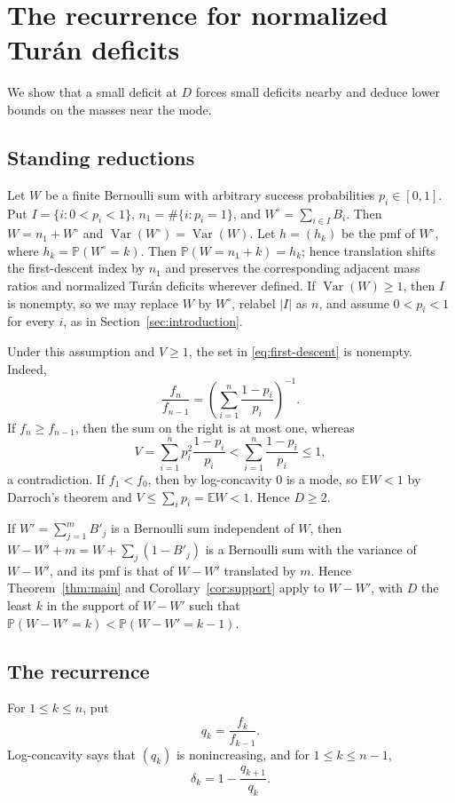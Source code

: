 \documentclass[ECP]{ejpecp}
\newcommand{\Pp}{\mathbb{P}}
\newcommand{\Var}{\operatorname{Var}}
\begin{document}
\section{The recurrence for normalized Tur\'an deficits}
\label{sec:propagation}

We show that a small deficit at $D$ forces small deficits nearby and deduce
lower bounds on the masses near the mode.

\subsection{Standing reductions}\label{sec:reduction}

Let $W$ be a finite Bernoulli sum with arbitrary success probabilities
$p_i\in[0,1]$. Put
$I=\{i:0<p_i<1\}$,
$n_1=\#\{i:p_i=1\}$, and
$W^\circ=\sum_{i\in I}B_i$. Then $W=n_1+W^\circ$ and
$\Var(W^\circ)=\Var(W)$. Let $h=(h_k)$ be the pmf of $W^\circ$, where
$h_k=\Pp(W^\circ=k)$. Then $\Pp(W=n_1+k)=h_k$; hence translation shifts the
first-descent index by $n_1$ and
preserves the corresponding adjacent mass ratios and normalized Tur\'an
deficits wherever defined. If $\Var(W)\geq1$, then $I$ is nonempty, so we may
replace $W$ by $W^\circ$, relabel $|I|$ as $n$, and assume $0<p_i<1$ for every
$i$, as in Section~\ref{sec:introduction}.

Under this assumption and $V\geq1$, the set in \eqref{eq:first-descent} is
nonempty. Indeed,
\[
  \frac{f_n}{f_{n-1}}
  =\left(\sum_{i=1}^n\frac{1-p_i}{p_i}\right)^{-1}.
\]
If $f_n\geq f_{n-1}$, then the sum on the right is at most one, whereas
\[
  V=\sum_{i=1}^n p_i^2\frac{1-p_i}{p_i}
  <\sum_{i=1}^n\frac{1-p_i}{p_i}\leq1,
\]
a contradiction. If $f_1<f_0$, then by log-concavity $0$ is a mode, so
$\mathbb EW<1$ by Darroch's theorem \cite[Theorem~4]{darroch1964} and
$V\leq\sum_ip_i=\mathbb EW<1$. Hence $D\geq2$.

If $W'=\sum_{j=1}^mB'_j$ is a Bernoulli sum independent of $W$, then
$W-W'+m=W+\sum_{j}(1-B'_j)$ is a Bernoulli sum with the variance of $W-W'$,
and its pmf is that of $W-W'$ translated by $m$. Hence
Theorem~\ref{thm:main} and Corollary~\ref{cor:support} apply to $W-W'$, with
$D$ the least $k$ in the support of $W-W'$ such that
$\Pp(W-W'=k)<\Pp(W-W'=k-1)$.

\subsection{The recurrence}

For $1\leq k\leq n$, put
\[
  q_k=\frac{f_k}{f_{k-1}}.
\]
Log-concavity says that $(q_k)$ is nonincreasing, and for
$1\leq k\leq n-1$,
\begin{equation}\label{eq:delta-ratio}
  \delta_k=1-\frac{q_{k+1}}{q_k}.
\end{equation}
\end{document}
